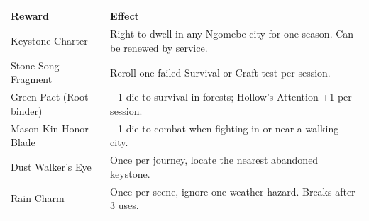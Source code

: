 \begin{tcolorbox}[colback=black!3,colframe=green!60!black,title={The Nine Rollers: A City on the Edge},breakable]
  \begin{longtable}{|p{}|p{}|}
  \hline
  \textbf{Reward} & \textbf{Effect} \\
  \hline
  Keystone Charter & Right to dwell in any Ngomebe city for one season. Can be renewed by service. \\
  \hline
  Stone-Song Fragment & Reroll one failed Survival or Craft test per session. \\
  \hline
  Green Pact (Root-binder) & +1 die to survival in forests; Hollow's Attention +1 per session. \\
  \hline
  Mason-Kin Honor Blade & +1 die to combat when fighting in or near a walking city. \\
  \hline
  Dust Walker's Eye & Once per journey, locate the nearest abandoned keystone. \\
  \hline
  Rain Charm & Once per scene, ignore one weather hazard. Breaks after 3 uses. \\
  \hline
  \end{longtable}
  
\end{tcolorbox}


